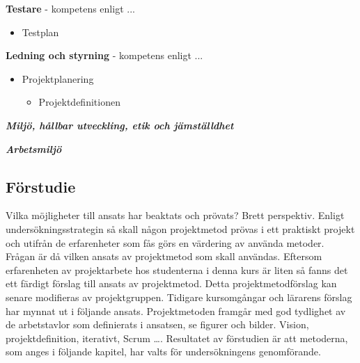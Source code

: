 \textbf{Testare} - kompetens enligt ...
\begin{itemize}
    \item Testplan
\end{itemize}

\textbf{Ledning och styrning} - kompetens enligt ...
\begin{itemize}
    \item Projektplanering
    \begin{itemize}
        \item Projektdefinitionen
    \end{itemize}
\end{itemize}

\textit{\textbf{Miljö, hållbar utveckling, etik och jämställdhet}}

\textit{\textbf{Arbetsmiljö}}

\subsection{Förstudie}
Vilka möjligheter till ansats har beaktats och prövats? Brett perspektiv.
Enligt undersökningsstrategin så skall någon projektmetod prövas i ett 
praktiskt projekt och utifrån de erfarenheter som fås görs en värdering
av använda metoder. Frågan är då vilken ansats av projektmetod som skall 
användas. Eftersom erfarenheten av projektarbete hos studenterna i denna 
kurs är liten så fanns det ett färdigt förslag till ansats av projektmetod. 
Detta projektmetodförslag kan senare modifieras av projektgruppen.
Tidigare kursomgångar och lärarens förslag har mynnat ut i följande ansats.
Projektmetoden framgår med god tydlighet av de arbetstavlor som definierats 
i ansatsen, se figurer och bilder.
Vision, projektdefinition, iterativt, Scrum ….
Resultatet av förstudien är att metoderna, som anges i följande kapitel,
har valts för undersökningens genomförande.\\

